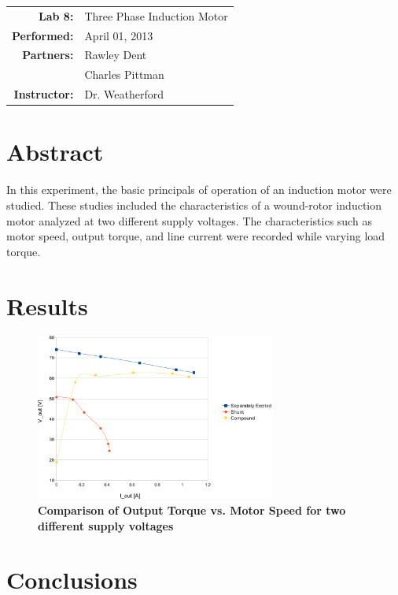 \documentclass{article}
\begin{document}
\begin{tabular}{rl}
  \textbf{Lab 8:} & Three Phase Induction Motor\\
  \textbf{Performed:} & April 01, 2013 \\
  \textbf{Partners:} & Rawley Dent \\ & Charles Pittman \\
  \textbf{Instructor:} & Dr. Weatherford
\end{tabular}


\section*{Abstract}

In this experiment, the basic principals of operation of an induction motor were studied. These studies included the 
characteristics of a wound-rotor induction motor analyzed at two different supply voltages. The characteristics such 
as motor speed, output torque, and line current were recorded while varying load torque.

\section*{Results}

\begin{figure}[H]
  \centering
    \includegraphics[width=0.7\textwidth]{img/graph}
    \caption{\textbf{Comparison of Output Torque vs. Motor Speed for two different supply voltages}}
    \label{fig:graph}
\end{figure}

\section*{Conclusions}
\end{document}
